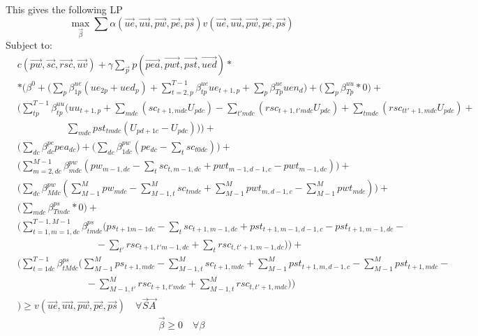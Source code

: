\documentclass{article}
\begin{document}
This gives the following LP
\begin{equation}
	\max_{\vec{\beta}} \sum \alpha (\vec{ue}, \vec{uu}, \vec{pw}, \vec{pe}, \vec{ps}) v(\vec{ue}, \vec{uu}, \vec{pw}, \vec{pe}, \vec{ps})
\end{equation}
Subject to:
\begin{align*}
	& c(\vec{pw}, \vec{sc}, \vec{rsc}, \vec{uv}) + \gamma \sum_{\vec{p}} p(\vec{pea}, \vec{pwt}, \vec{pst}, \vec{ued})  *  \\
		& * \Bigg( \beta^{0} +
		\bigg( \sum_{p} \beta_{1p}^{ue} (ue_{2p} + ued_{p}) + 
				\sum_{t=2,p}^{T-1} \beta_{tp}^{ue} ue_{t+1,p} + 
				\sum_{p} \beta_{Tp}^{ue} uen_{d} \bigg) +
		\bigg( \sum_{p} \beta_{Tp}^{uu} * 0 \bigg) + \\
		& \bigg( \sum_{tp}^{T-1} \beta_{tp}^{uu} 
				\Big( uu_{t+1,p} + \sum_{mdc} (sc_{t+1,mdc}U_{pdc})  - 
				\sum_{t'mdc} (rsc_{t+1,t'mdc} U_{pdc}) + \sum_{tmdc} (rsc_{tt'+1,mdc} U_{pdc})  + \\ 
				& \quad \quad \quad \quad \quad \sum_{mdc} pst_{tmdc} (U_{pd+1c} - U_{pdc}) \Big) \bigg) +  \\
		& \bigg( \sum_{dc} \beta_{dc}^{pe} pea_{dc} \bigg) + 
			\bigg( \sum_{dc} \beta_{1dc}^{pw} (pe_{dc} - \sum_{t} sc_{t0dc}) \bigg) + \\
		&  \bigg( \sum_{m=2,dc}^{M-1} \beta_{mdc}^{pw} 
			(pw_{m-1,dc} - \sum_{t} sc_{t,m-1,dc} + pwt_{m-1,d-1,c} - pwt_{m-1,dc}) \bigg) + \\
		& \bigg( \sum_{dc} \beta_{Mdc}^{pw} 
			(\sum_{M-1}^{M} pw_{mdc} - \sum_{M-1,t}^{M} sc_{tmdc} + 
			\sum_{M-1}^{M} pwt_{m,d-1,c} - \sum_{M-1}^{M} pwt_{mdc}) \bigg) + \\
		& \bigg( \sum_{mdc} \beta_{Tmdc}^{ps} * 0  \bigg) + \\
		& \bigg( \sum_{t=1,m=1,dc}^{T-1,M-1} \beta_{tmdc}^{ps} 
			\Big( ps_{t+1m-1dc} - \sum_{t} sc_{t+1,m-1,dc} + 
			pst_{t+1,m-1,d-1,c} - pst_{t+1,m-1,dc} - \\
		& \quad \quad \quad \quad \quad \quad  \quad \quad- \sum_{t'} rsc_{t+1,t'm-1,dc} +  \sum_{t} rsc_{t,t'+1,m-1,dc} \Big) \bigg) + \\
		& \bigg( \sum_{t=1dc}^{T-1} \beta_{tMdc}^{ps} 
			\Big( \sum_{M-1}^{M} ps_{t+1,mdc} - \sum_{M-1,t}^{M} sc_{t+1,mdc} + 
			\sum_{M-1}^{M} pst_{t+1,m,d-1,c} - \sum_{M-1}^{M} pst_{t+1,mdc} - \\ 
			& \quad \quad \quad \quad \quad \quad \quad - \sum_{M-1,t'}^{M} rsc_{t+1,t'mdc} +  \sum_{M-1,t}^{M} rsc_{t,t'+1,mdc} \Big) \bigg) \\
		& \Bigg) \ge v(\vec{ue}, \vec{uu}, \vec{pw}, \vec{pe}, \vec{ps}) \quad \forall \vec{S} \vec{A}
\end{align*}
\begin{equation*}
	\vec{\beta} \ge 0 \quad \forall \beta
\end{equation*}
\end{document}
